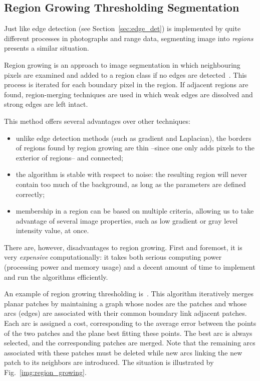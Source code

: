 \subsection{Region Growing Thresholding Segmentation}

Just like edge detection (see Section~\ref{sec:edge_det}) is implemented by quite different processes in photographs and range data, segmenting image into \emph{regions}
 presents a similar situation.

Region growing is an approach to image segmentation in which neighbouring pixels are examined and added to a region class if no edges are detected~\cite{forsyth}. This process is iterated for each boundary pixel in the region. If adjacent regions are found, region-merging techniques are used in which weak edges are dissolved and strong edges are left intact.

This method offers several advantages over other techniques:
\begin{itemize}
\item unlike edge detection methods (such as gradient and Laplacian), the borders of regions found by region growing are thin --since one only adds pixels to the exterior of regions-- and connected;

\item the algorithm is stable with respect to noise: the resulting region will never contain too much of the background, as long as the parameters are defined correctly;

\item membership in a region can be based on multiple criteria, allowing us to take advantage of several image properties, such as low gradient or gray level intensity value, at once.
\end{itemize}

There are, however, disadvantages to region growing. First and foremost, it is very \emph{expensive} computationally: it takes both serious computing power (processing power and memory usage) and a decent amount of time to implement and run the algorithms efficiently.

An example of region growing thresholding is~\cite{faugeras:1986}. This algorithm iteratively merges planar patches by maintaining a graph whose nodes are the patches and whose arcs (edges) are associated with their common boundary link adjacent patches. Each arc is assigned a cost, corresponding to the average error between the points of the two patches and the plane best fitting these points. The best arc is always selected, and the corresponding patches are merged. Note that the remaining arcs associated with these patches must be deleted while new arcs linking the new patch to its neighbors are introduced. The situation is illustrated by Fig.~\ref{img:region_growing}.

